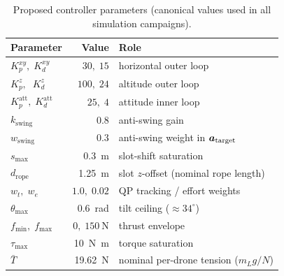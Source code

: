 \begin{table}[t]
  \centering
  \caption{Proposed controller parameters (canonical values used
  in all simulation campaigns).}
  \label{tab:baseline-params}
  \small
  \renewcommand{\arraystretch}{1.05}
  \begin{tabular}{lrl}
    \toprule
    Parameter & Value & Role \\
    \midrule
    $K_p^{xy},\; K_d^{xy}$
      & $30,\;15$
      & horizontal outer loop \\
    $K_p^{z},\;\; K_d^{z}$
      & $100,\;24$
      & altitude outer loop \\
    $K_p^{\mathrm{att}},\; K_d^{\mathrm{att}}$
      & $25,\;4$
      & attitude inner loop \\
    $k_{\mathrm{swing}}$
      & $0.8$
      & anti-swing gain \\
    $w_{\mathrm{swing}}$
      & $0.3$
      & anti-swing weight in $\boldsymbol{a}_{\mathrm{target}}$ \\
    $s_{\max}$
      & \SI{0.3}{\metre}
      & slot-shift saturation \\
    $d_{\mathrm{rope}}$
      & \SI{1.25}{\metre}
      & slot $z$-offset (nominal rope length) \\
    $w_t,\; w_e$
      & $1.0,\;0.02$
      & QP tracking / effort weights \\
    $\theta_{\max}$
      & \SI{0.6}{\radian}
      & tilt ceiling (${\approx}34^{\circ}$) \\
    $f_{\min},\; f_{\max}$
      & $0,\;\SI{150}{\newton}$
      & thrust envelope \\
    $\tau_{\max}$
      & \SI{10}{\newton\metre}
      & torque saturation \\
    $\bar{T}$
      & \SI{19.62}{\newton}
      & nominal per-drone tension ($m_L g/N$) \\
    \bottomrule
  \end{tabular}
\end{table}